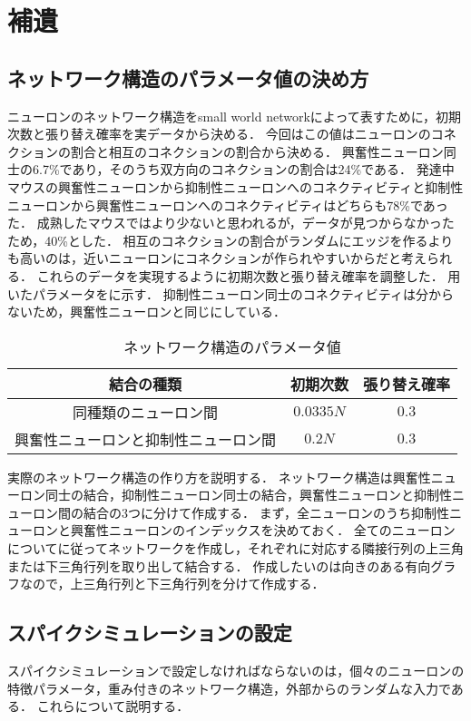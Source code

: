 \section{補遺}
\subsection{ネットワーク構造のパラメータ値の決め方}
\label{sec:Sparam}
ニューロンのネットワーク構造をsmall world networkによって表すために，初期次数と張り替え確率を実データから決める．
今回はこの値はニューロンのコネクションの割合と相互のコネクションの割合から決める．
興奮性ニューロン同士の6.7\%であり，そのうち双方向のコネクションの割合は24\%である\cite{Jouhanneau2015}．
発達中マウスの興奮性ニューロンから抑制性ニューロンへのコネクティビティと抑制性ニューロンから興奮性ニューロンへのコネクティビティはどちらも78\%であった\cite{Holmgren2003}．
成熟したマウスではより少ないと思われるが，データが見つからなかったため，40\%とした．
相互のコネクションの割合がランダムにエッジを作るよりも高いのは，近いニューロンにコネクションが作られやすいからだと考えられる．
これらのデータを実現するように初期次数と張り替え確率を調整した．
用いたパラメータをに示す．
抑制性ニューロン同士のコネクティビティは分からないため，興奮性ニューロンと同じにしている．

\begin{table}[htb]
  \center
  \begin{tabular}{|c|cc|} \hline
    結合の種類 & 初期次数 & 張り替え確率 \\ \hline
		同種類のニューロン間 & $0.0335 N$ & $0.3$ \\
		興奮性ニューロンと抑制性ニューロン間 & $0.2N$ & $0.3$\\ \hline
  \end{tabular}
  \caption{ネットワーク構造のパラメータ値}
  \label{tab:parameter1}
\end{table}

実際のネットワーク構造の作り方を説明する．
ネットワーク構造は興奮性ニューロン同士の結合，抑制性ニューロン同士の結合，興奮性ニューロンと抑制性ニューロン間の結合の3つに分けて作成する．
まず，全ニューロンのうち抑制性ニューロンと興奮性ニューロンのインデックスを決めておく．
全てのニューロンについてに従ってネットワークを作成し，それぞれに対応する隣接行列の上三角または下三角行列を取り出して結合する．
作成したいのは向きのある有向グラフなので，上三角行列と下三角行列を分けて作成する．

\subsection{スパイクシミュレーションの設定}
\label{sec:spikeparam}
スパイクシミュレーションで設定しなければならないのは，個々のニューロンの特徴パラメータ，重み付きのネットワーク構造，外部からのランダムな入力である．
これらについて説明する．

